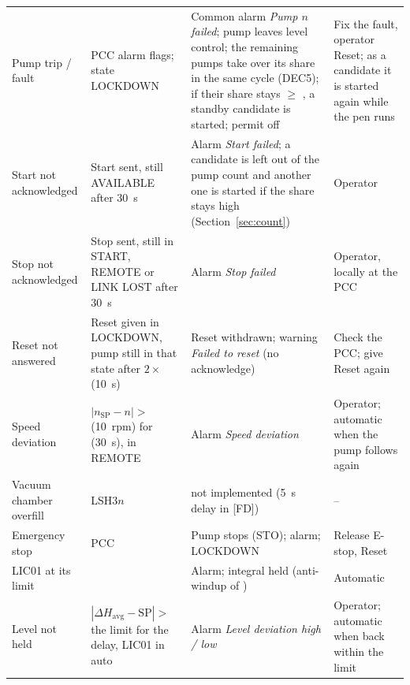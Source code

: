 \documentclass[11pt,a4paper]{article}
\begin{document}
\begin{small}
\begin{longtable}{@{}P{30mm}P{34mm}P{50mm}P{38mm}@{}}
Pump trip / fault & PCC alarm flags; state LOCKDOWN & Common alarm \emph{Pump $n$ failed}; pump leaves level control; the remaining pumps take over its share in the same cycle (DEC5); if their share stays $\ge$ , a standby candidate is started; permit off & Fix the fault, operator Reset; as a candidate it is started again while the pen runs \\
Start not acknowledged & Start sent, still AVAILABLE after 30~s & Alarm \emph{Start failed}; a candidate is left out of the pump count and another one is started if the share stays high (Section~\ref{sec:count}) & Operator \\
Stop not acknowledged & Stop sent, still in START, REMOTE or LINK LOST after 30~s & Alarm \emph{Stop failed} & Operator, locally at the PCC \\
Reset not answered & Reset given in LOCKDOWN, pump still in that state after $2\times$ (10~s) & Reset withdrawn; warning \emph{Failed to reset} (no acknowledge) & Check the PCC; give Reset again \\
Speed deviation & $|n_\text{SP}-n| >$  (10~rpm) for  (30~s), in REMOTE & Alarm \emph{Speed deviation} & Operator; automatic when the pump follows again \\
Vacuum chamber overfill & LSH3$n$ & not implemented (5~s delay in [FD]) & -- \\
Emergency stop & PCC  & Pump stops (STO); alarm; LOCKDOWN & Release E-stop, Reset \\
LIC01 at its limit &  & Alarm; integral held (anti-windup of ) & Automatic \\
Level not held & $|\Delta H_\text{avg}-\mathrm{SP}| >$ the limit for the delay, LIC01 in auto & Alarm \emph{Level deviation high / low} & Operator; automatic when back within the limit \\
\end{longtable}
\end{small}
\end{document}
